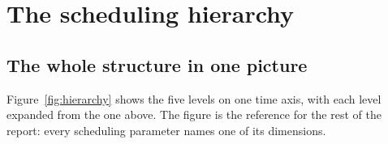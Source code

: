 \documentclass[11pt,a4paper]{article}
\begin{document}
\section{The scheduling hierarchy}
\label{sec:hier}

\subsection{The whole structure in one picture}

Figure~\ref{fig:hierarchy} shows the five levels on one time axis, with each level expanded from the
one above. The figure is the reference for the rest of the report: every scheduling parameter names
one of its dimensions.
\end{document}
